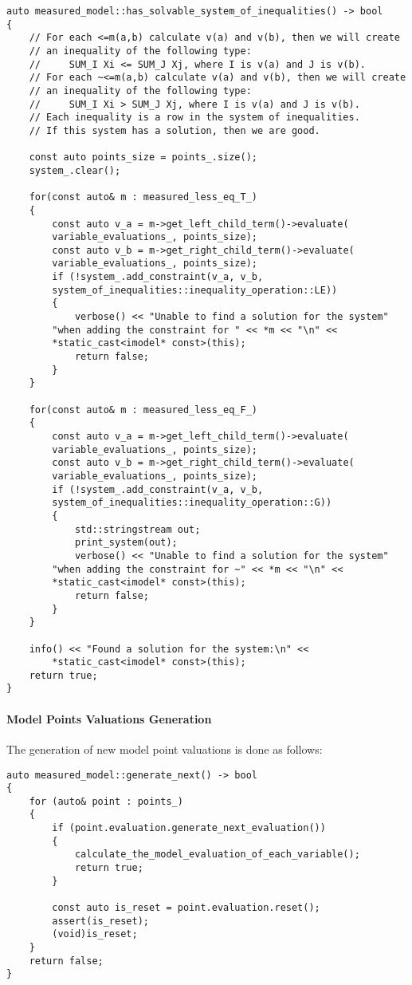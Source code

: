 \documentclass{article}
\begin{document}
\begin{lstlisting}
auto measured_model::has_solvable_system_of_inequalities() -> bool
{
    // For each <=m(a,b) calculate v(a) and v(b), then we will create
    // an inequality of the following type: 
    //     SUM_I Xi <= SUM_J Xj, where I is v(a) and J is v(b).
    // For each ~<=m(a,b) calculate v(a) and v(b), then we will create
    // an inequality of the following type: 
    //     SUM_I Xi > SUM_J Xj, where I is v(a) and J is v(b).
    // Each inequality is a row in the system of inequalities. 
    // If this system has a solution, then we are good.

    const auto points_size = points_.size();
    system_.clear();

    for(const auto& m : measured_less_eq_T_)
    {
        const auto v_a = m->get_left_child_term()->evaluate(
		variable_evaluations_, points_size);
        const auto v_b = m->get_right_child_term()->evaluate(
		variable_evaluations_, points_size);
        if (!system_.add_constraint(v_a, v_b,
		system_of_inequalities::inequality_operation::LE))
        {
            verbose() << "Unable to find a solution for the system"
		"when adding the constraint for " << *m << "\n" << 
		*static_cast<imodel* const>(this);
            return false;
        }
    }

    for(const auto& m : measured_less_eq_F_)
    {
        const auto v_a = m->get_left_child_term()->evaluate(
		variable_evaluations_, points_size);
        const auto v_b = m->get_right_child_term()->evaluate(
		variable_evaluations_, points_size);
        if (!system_.add_constraint(v_a, v_b,
		system_of_inequalities::inequality_operation::G))
        {
            std::stringstream out;
            print_system(out);
            verbose() << "Unable to find a solution for the system"
		"when adding the constraint for ~" << *m << "\n" <<
		*static_cast<imodel* const>(this);
            return false;
        }
    }

    info() << "Found a solution for the system:\n" <<
		*static_cast<imodel* const>(this);
    return true;
}
\end{lstlisting}

	\paragraph{Model Points Valuations Generation}
	The generation of new model point valuations is done as follows:

\begin{lstlisting}
auto measured_model::generate_next() -> bool
{
    for (auto& point : points_)
    {
        if (point.evaluation.generate_next_evaluation())
        {
            calculate_the_model_evaluation_of_each_variable();
            return true;
        }

        const auto is_reset = point.evaluation.reset();
        assert(is_reset);
        (void)is_reset;
    }
    return false;
}
\end{lstlisting}
\end{document}
